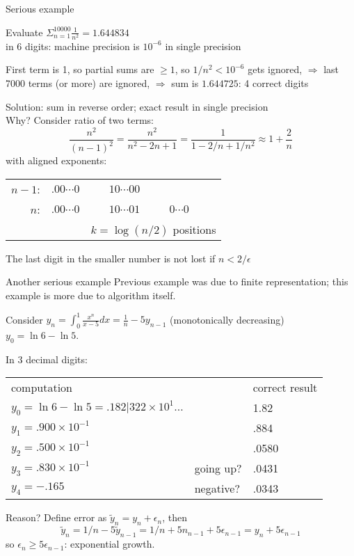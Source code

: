 \begin{numberedframe}{Serious example}
  \small

Evaluate $\Sigma_{n=1}^{10000}\frac{1}{n^2}=1.644834$ \\
in 6 digits: machine precision is $10^{-6}$ in single precision

First term is 1, so partial sums are $\geq1$, so $1/n^2<10^{-6}$ gets
ignored,
$\Rightarrow$ last 7000 terms (or more) are ignored,
$\Rightarrow$ sum is $1.644725$: 4 correct digits

Solution: sum in reverse order; exact result in single precision\\
Why? Consider ratio of two terms:
\[ \frac{n^2}{(n-1)^2}=\frac{n^2}{n^2-2n+1}=\frac1{1-2/n+1/n^2}
    \approx 1+\frac2n
\]
with aligned exponents:\\
\begin{tabular}{rrcl}
  $n-1$:&$.00\cdots0$&$10\cdots00$\\
  $n$:&  $.00\cdots0$&$10\cdots01$&$0\cdots0$\\
      &             &\multicolumn{2}{l}{$k=\log(n/2)$ positions}
\end{tabular}

The last digit in the smaller number is not lost if $n<2/\epsilon$
\end{numberedframe}

\begin{numberedframe}{Another serious example}
\small
Previous example was due to finite representation; this example is
more due to algorithm itself.

Consider $y_n=\int_0^1 \frac{x^n}{x-5}dx = \frac1n-5y_{n-1}$
(monotonically decreasing)\\
$y_0=\ln 6 - \ln 5$.

In 3 decimal digits:\\
\begin{tabular}{lll}
  computation&&correct result\\
  $y_0=\ln 6 - \ln 5=.182|322\times 10^{1}\ldots$&&1.82\\
  $y_1=.900\times 10^{-1}$&&.884\\
  $y_2=.500\times 10^{-1}$&&.0580\\
  $y_3=.830\times 10^{-1}$&going up?&.0431\\
  $y_4=-.165$&negative?&.0343
\end{tabular}

Reason? Define error as $\tilde y_n=y_n+\epsilon_n$, then
\[ \tilde y_n=1/n-5\tilde y_{n-1}=1/n+5n_{n-1}+5\epsilon_{n-1}
    = y_n+5\epsilon_{n-1} \]
so $\epsilon_n\geq 5\epsilon_{n-1}$: exponential growth.
\end{numberedframe}

